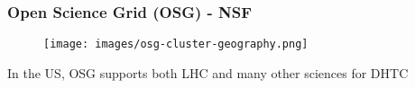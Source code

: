 \begin{frame}
\frametitle{Open Science Grid (OSG) - NSF}

\begin{figure}[htbp]
\begin{center}
\texttt{[image: images/osg-cluster-geography.png]}
\end{center}
\end{figure}

\begin{center}
\small{In the US, OSG supports both LHC and many other sciences for DHTC}
\end{center}

\end{frame}


